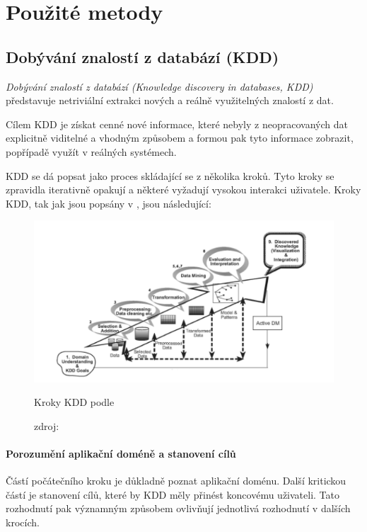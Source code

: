 \documentclass[thesis=M,czech]{FITthesis}[2012/06/26]
\begin{document}
\chapter{Použité metody}
\section{Dobývání znalostí z databází (KDD)}
\textit{Dobývání znalostí z databází (Knowledge discovery in databases, KDD)} představuje netriviální extrakci nových a reálně využitelných znalostí z dat\cite{kddb}. 

Cílem KDD je získat cenné nové informace, které nebyly z neopracovaných dat explicitně viditelné a vhodným způsobem a formou pak tyto informace zobrazit, popřípadě využít v reálných systémech.\cite{fayyad}

KDD se dá popsat jako proces skládající se z několika kroků. Tyto kroky se zpravidla iterativně opakují a některé vyžadují vysokou interakci uživatele. Kroky KDD, tak jak jsou popsány v \cite{hbcap}, jsou následující:

\begin{figure}[htbp]
\begin{center}
	\includegraphics[scale=0.75]{kdd_steps}
\caption{Kroky KDD podle \cite{fayyad}}
\end{center}
  \caption*{zdroj: \cite{fayyad}}
\end{figure}

\subsubsection*{Porozumění aplikační doméně a stanovení cílů}
Částí počátečního kroku je důkladně poznat aplikační doménu. Další kritickou částí je stanovení cílů, které by KDD měly přinést koncovému uživateli. Tato rozhodnutí pak významným způsobem ovlivňují jednotlivá rozhodnutí v dalších krocích.
 		
\end{document}
